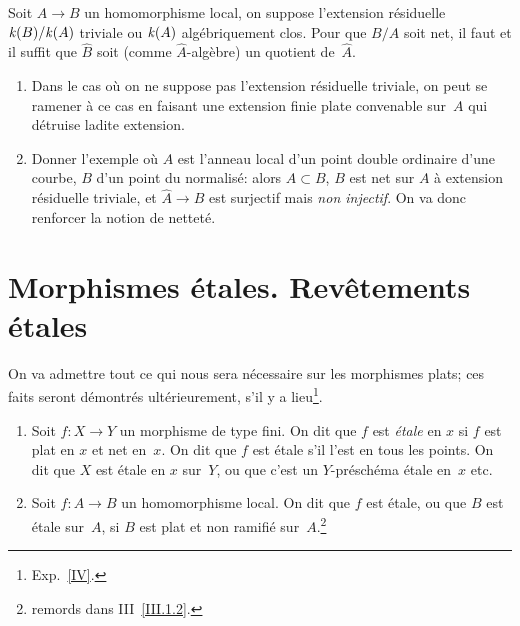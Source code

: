 \begin{proposition}
\label{I.3.7}
Soit $A\to B$ un homomorphisme local, on suppose l'extension
r\'esiduelle $\mathit{k}(B)/\mathit{k}(A)$ triviale ou $\mathit{k}(A)$ alg\'ebriquement
clos. Pour que $B/A$ soit net, il faut et il suffit que $\widehat{B}$
soit (comme $\widehat{A}$-alg\`ebre) un quotient de~$\widehat{A}$.
\end{proposition}

\begin{remarquesstar}
\begin{enumerate}
\item[--] Dans le cas o\`u on ne suppose pas l'extension
r\'esiduelle triviale, on peut se ramener \`a ce cas en faisant
une extension finie plate convenable sur~$A$ qui d\'etruise ladite
extension.
\item[--] Donner l'exemple o\`u $A$ est l'anneau local d'un point
double ordinaire d'une courbe, $B$ d'un point du normalis\'e: alors
$A\subset B$, $B$ est net sur
$A$ \`a extension r\'esiduelle triviale, et
$\widehat{A}\to\widehat{B}$ est surjectif mais \emph{non injectif}. On
va donc renforcer la notion de nettet\'e.
\end{enumerate}
\end{remarquesstar}

\section{Morphismes \'etales. Rev\^etements \'etales}
\label{I.4}
On va admettre tout ce qui nous sera n\'ecessaire sur les morphismes
plats; ces faits seront d\'emontr\'es ult\'erieurement, s'il y a
lieu\footnote{\Cf Exp.\, \ref{IV}.}.

\begin{definition}
\label{I.4.1}
\begin{enumerate}
\item[a)] Soit $f\colon X\to Y$ un morphisme de type fini. On dit que
$f$ est \emph{étale}
en $x$ si $f$ est plat en $x$ et net en~$x$. On dit que $f$ est
\'etale s'il l'est en tous les points. On dit que $X$ est \'etale
en $x$ sur~$Y$, ou que c'est un $Y$-pr\'esch\'ema \'etale en~$x$
etc.
\item[b)] Soit $f\colon A\to B$ un homomorphisme local. On dit que $f$
est \'etale, ou que $B$ est \'etale sur~$A$, si $B$ est plat et
non ramifi\'e sur~$A$.\footnote{\Cf remords dans III~\ref{III.1.2}.}
\end{enumerate}
\end{definition}

